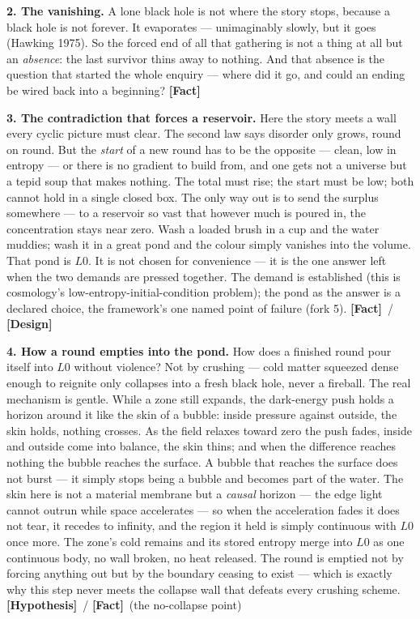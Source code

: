 \documentclass[11pt]{article}
\newcommand{\Fact}{\textbf{\textcolor{green!45!black}{[Fact]}}}
\newcommand{\Hyp}{\textbf{\textcolor{blue!55!black}{[Hypothesis]}}}
\newcommand{\Design}{\textbf{\textcolor{purple!65!black}{[Design]}}}
\begin{document}
\noindent\textbf{2. The vanishing.} A lone black hole is not where the story stops, because a black hole is not forever. It evaporates --- unimaginably slowly, but it goes (Hawking 1975). So the forced end of all that gathering is not a thing at all but an \emph{absence}: the last survivor thins away to nothing. And that absence is the question that started the whole enquiry --- where did it go, and could an ending be wired back into a beginning? \Fact

\noindent\textbf{3. The contradiction that forces a reservoir.} Here the story meets a wall every cyclic picture must clear. The second law says disorder only grows, round on round. But the \emph{start} of a new round has to be the opposite --- clean, low in entropy --- or there is no gradient to build from, and one gets not a universe but a tepid soup that makes nothing. The total must rise; the start must be low; both cannot hold in a single closed box. The only way out is to send the surplus somewhere --- to a reservoir so vast that however much is poured in, the concentration stays near zero. Wash a loaded brush in a cup and the water muddies; wash it in a great pond and the colour simply vanishes into the volume. That pond is $L0$. It is not chosen for convenience --- it is the one answer left when the two demands are pressed together. The demand is established (this is cosmology's low-entropy-initial-condition problem); the pond as the answer is a declared choice, the framework's one named point of failure (fork 5). \Fact\ / \Design

\noindent\textbf{4. How a round empties into the pond.} How does a finished round pour itself into $L0$ without violence? Not by crushing --- cold matter squeezed dense enough to reignite only collapses into a fresh black hole, never a fireball. The real mechanism is gentle. While a zone still expands, the dark-energy push holds a horizon around it like the skin of a bubble: inside pressure against outside, the skin holds, nothing crosses. As the field relaxes toward zero the push fades, inside and outside come into balance, the skin thins; and when the difference reaches nothing the bubble reaches the surface. A bubble that reaches the surface does not burst --- it simply stops being a bubble and becomes part of the water. The skin here is not a material membrane but a \emph{causal} horizon --- the edge light cannot outrun while space accelerates --- so when the acceleration fades it does not tear, it recedes to infinity, and the region it held is simply continuous with $L0$ once more. The zone's cold remains and its stored entropy merge into $L0$ as one continuous body, no wall broken, no heat released. The round is emptied not by forcing anything out but by the boundary ceasing to exist --- which is exactly why this step never meets the collapse wall that defeats every crushing scheme. \Hyp\ / \Fact\ (the no-collapse point)
\end{document}
